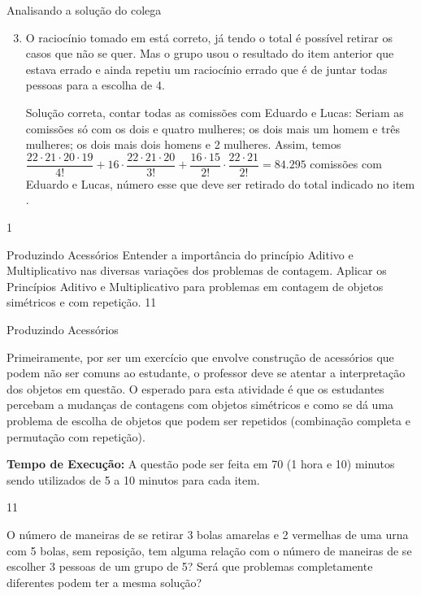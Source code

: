 \mspace{.5em}
\begin{answer}{Analisando a solução do colega}
{
\begin{enumerate}\setcounter{enumi}{2}
\item O raciocínio tomado em  está correto, já tendo o total é possível retirar os casos que não se quer. Mas o grupo usou o resultado do item anterior que estava errado e ainda repetiu um raciocínio errado que é de juntar todas pessoas para a escolha de 4. 

Solução correta, contar todas as comissões com Eduardo e Lucas: Seriam as comissões só com os dois e quatro mulheres; os dois mais um homem e três mulheres; os dois mais dois homens e 2 mulheres. Assim, temos
$\dfrac{22 \cdot 21 \cdot 20\cdot 19}{4!}+16 \cdot \dfrac{22 \cdot 21 \cdot 20}{3!}+\dfrac{16 \cdot 15}{2!}\cdot \dfrac{22 \cdot 21}{2!} = 84.295$ comissões com Eduardo e Lucas, número esse que deve ser retirado do total indicado no item .
\end{enumerate}
}{1}
\end{answer}
\begin{objectives}{Produzindo Acessórios}
{
Entender a importância do princípio Aditivo e Multiplicativo nas diversas variações dos problemas de contagem. Aplicar os Princípios Aditivo e Multiplicativo para problemas em contagem de objetos simétricos e com repetição.
}{1}{1}
\end{objectives}

\begin{sugestions}{Produzindo Acessórios}
{
Primeiramente, por ser um exercício que envolve construção de acessórios que podem não ser comuns ao estudante, o professor deve se atentar a interpretação dos objetos em questão. O esperado para esta atividade é que os estudantes percebam a mudanças de contagens com objetos simétricos e como se dá uma problema de escolha de objetos que podem ser repetidos (combinação completa e permutação com repetição).

\textbf{Tempo de Execução:} A questão pode ser feita em 70 (1 hora e 10) minutos sendo utilizados de 5 a 10 minutos para cada item.
}{1}{1}
\end{sugestions}


O número de maneiras de se retirar 3 bolas amarelas e 2 vermelhas de uma urna com 5 bolas, sem reposição, tem alguma relação com o número de maneiras de se escolher 3 pessoas de um grupo de 5? Será que problemas completamente diferentes podem ter a mesma solução?

